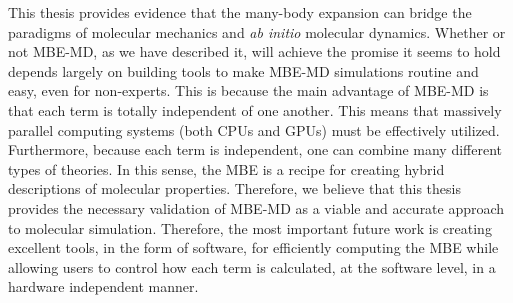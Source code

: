 \documentclass[11pt, proquest]{uwthesis}[2020/02/24]
\begin{document}
\par This thesis provides evidence that the many-body expansion can bridge the paradigms of molecular mechanics and \textit{ab initio} molecular dynamics. Whether or not MBE-MD, as we have described it, will achieve the promise it seems to hold depends largely on building tools to make MBE-MD simulations routine and easy, even for non-experts. This is because the main advantage of MBE-MD is that each term is totally independent of one another. This means that massively parallel computing systems (both CPUs and GPUs) must be effectively utilized. Furthermore, because each term is independent, one can combine many different types of theories. In this sense, the MBE is a recipe for creating hybrid descriptions of molecular properties. Therefore, we believe that this thesis provides the necessary validation of MBE-MD as a viable and accurate approach to molecular simulation. Therefore, the most important future work is creating excellent tools, in the form of software, for efficiently computing the MBE while allowing users to control how each term is calculated, at the software level, in a hardware independent manner.
\end{document}
